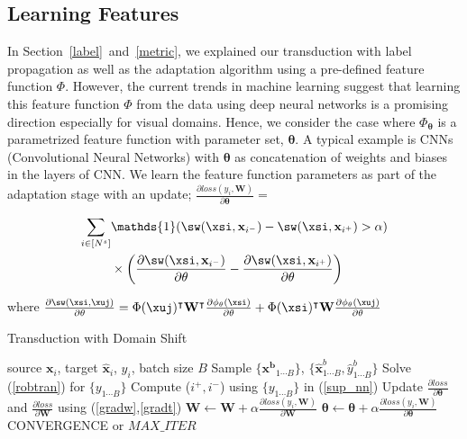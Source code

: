 \subsection{Learning Features}
In Section~\ref{label}~and~\ref{metric}, we explained our transduction with label propagation as well as the adaptation algorithm using a pre-defined feature function $\Phi$. However, the current trends in machine learning suggest that learning this feature function $\Phi$ from the data using deep neural networks is a promising direction especially for visual domains. Hence, we consider the case where $\Phi_{\mathbf{\theta}}$ is a parametrized feature function with parameter set, $\mathbf{\theta}$. A typical example is CNNs (Convolutional Neural Networks) with $\mathbf{\theta}$ as concatenation of weights and biases in the layers of CNN. We learn the feature function parameters as part of the adaptation stage with an update; $\frac{\partial loss (y_i, \mathbf{W})}{\partial \mathbf{\theta}} =$

\begin{small}
\begin{equation}
\begin{aligned}
 \sum_{i \in [N^s]} &\mathds{1}(\sw(\xsi,\mathbf{x}_{i^-}) - \sw(\xsi,\mathbf{x}_{i^+})>\alpha)  \\
 &\times \left(\frac{\partial \sw(\xsi,\mathbf{x}_{i^-}) }{\partial \mathbf{\theta}} - \frac{\partial \sw(\xsi,\mathbf{x}_{i^+}) }{\partial \mathbf{\theta}} \right)
 \label{gradt}
 \end{aligned}
\end{equation}
\end{small}
where {\small $\frac{\partial \sw(\xsi,\xuj) }{\partial \mathbf{\theta}} =\Phi(\xuj)^\intercal \mathbf{W}^\intercal \frac{\partial \phi_\mathbf{\theta}(\xsi)}{\partial \theta} + \Phi(\xsi)^\intercal \mathbf{W} \frac{\partial \phi_\mathbf{\theta}(\xuj)}{\partial \theta} $}

\begin{algorithm}[tb]
   \caption{Transduction with Domain Shift}
   \label{alg:example}
\begin{algorithmic}
    source $\mathbf{x}_i$, target $\mathbf{\hat{x}}_i$, $y_i$, batch size $B$
   \REPEAT
   \STATE  Sample $\{\mathbf{x^b}_{1 \cdots B}\}$, $\{\mathbf{\hat{x}}^b_{1 \cdots B}, \hat{y}^b_{1\cdots B}\}$
   \STATE Solve (\ref{robtran}) for $\{y_{1 \cdots B}\}$
   \STATE Compute ($i^+, i^-$) using $\{y_{1 \cdots B}\}$ in (\ref{sup_nn})
   \STATE Update $\frac{\partial loss}{\partial \mathbf{\theta}}$ and  $\frac{\partial loss}{\partial \mathbf{W}} $ using (\ref{gradw},\ref{gradt})
   \ENDIF
   \ENDFOR
   \STATE $\mathbf{W} \leftarrow \mathbf{W} + \alpha \frac{\partial loss (y_i, \mathbf{W})}{\partial \mathbf{W}}$ 
   \STATE $\mathbf{\theta} \leftarrow \mathbf{\theta} + \alpha \frac{\partial loss (y_i, \mathbf{W})}{\partial \mathbf{\theta}}$
   \UNTIL CONVERGENCE or $MAX\_ITER$
\end{algorithmic}
\end{algorithm}
